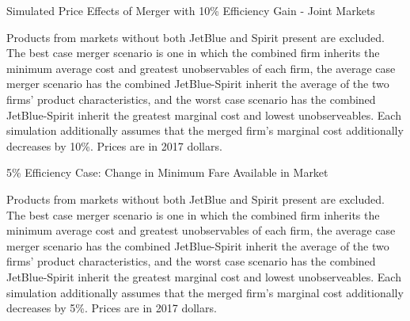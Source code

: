 \documentclass{article}
\begin{document}
\begin{appendices}
     
        \begin{table}
        \caption{Simulated Price Effects of Merger with 10\% Efficiency Gain - Joint Markets}
        \label{tab:Simulation_Price_10}
                \vspace{-15mm}
        \begin{center}
         
        \end{center}
        \vspace{-5mm}
        \footnotesize{Products from markets without both JetBlue and Spirit present are excluded. The best case merger scenario is one in which the combined firm inherits the minimum average cost and greatest unobservables of each firm, the average case merger scenario has the combined JetBlue-Spirit inherit the average of the two firms' product characteristics, and the worst case scenario has the combined JetBlue-Spirit inherit the greatest marginal cost and lowest unobserveables. Each simulation additionally assumes that the merged firm's marginal cost additionally decreases by 10\%. Prices are in 2017 dollars.}

     \end{table}

    \begin{table}
        \caption{5\% Efficiency Case: Change in Minimum Fare Available in Market}
        \label{tab:MinimumPrice_5}
                \vspace{-15mm}
        \begin{center}
            
        \end{center}
        \vspace{-5mm}
        \footnotesize{Products from markets without both JetBlue and Spirit present are excluded. The best case merger scenario is one in which the combined firm inherits the minimum average cost and greatest unobservables of each firm, the average case merger scenario has the combined JetBlue-Spirit inherit the average of the two firms' product characteristics, and the worst case scenario has the combined JetBlue-Spirit inherit the greatest marginal cost and lowest unobserveables. Each simulation additionally assumes that the merged firm's marginal cost additionally decreases by 5\%. Prices are in 2017 dollars.}
    \end{table}   


\end{appendices}
\end{document}
